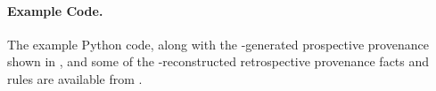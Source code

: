 \paragraph{Example Code.}
The example Python code, along with the \yw-generated prospective
provenance shown in , and some of the
\yw-reconstructed retrospective provenance facts and rules are
available from \cite{mcphillips2015example}.


